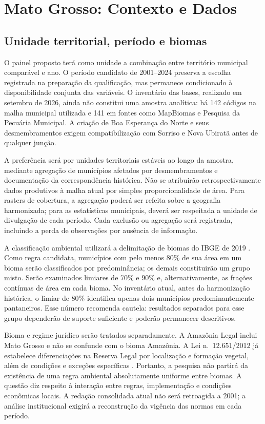 \section{Mato Grosso: Contexto e Dados}
\label{sec:dados}

\subsection{Unidade territorial, período e biomas}

O painel proposto terá como unidade a combinação entre território municipal comparável e ano. O período candidato de 2001--2024 preserva a escolha registrada na preparação da qualificação, mas permanece condicionado à disponibilidade conjunta das variáveis. O inventário das bases, realizado em setembro de 2026, ainda não constitui uma amostra analítica: há 142 códigos na malha municipal utilizada e 141 em fontes como MapBiomas e Pesquisa da Pecuária Municipal. A criação de Boa Esperança do Norte e seus desmembramentos exigem compatibilização com Sorriso e Nova Ubiratã antes de qualquer junção.

A preferência será por unidades territoriais estáveis ao longo da amostra, mediante agregação de municípios afetados por desmembramentos e documentação da correspondência histórica. Não se atribuirão retrospectivamente dados produtivos à malha atual por simples proporcionalidade de área. Para rasters de cobertura, a agregação poderá ser refeita sobre a geografia harmonizada; para as estatísticas municipais, deverá ser respeitada a unidade de divulgação de cada período. Cada exclusão ou agregação será registrada, incluindo a perda de observações por ausência de informação.

A classificação ambiental utilizará a delimitação de biomas do IBGE de 2019 \cite{IBGEBiomas2019}. Como regra candidata, municípios com pelo menos 80\% de sua área em um bioma serão classificados por predominância; os demais constituirão um grupo misto. Serão examinados limiares de 70\% e 90\% e, alternativamente, as frações contínuas de área em cada bioma. No inventário atual, antes da harmonização histórica, o limiar de 80\% identifica apenas dois municípios predominantemente pantaneiros. Esse número recomenda cautela: resultados separados para esse grupo dependerão de suporte suficiente e poderão permanecer descritivos.

Bioma e regime jurídico serão tratados separadamente. A Amazônia Legal inclui Mato Grosso e não se confunde com o bioma Amazônia. A Lei n.\ 12.651/2012 já estabelece diferenciações na Reserva Legal por localização e formação vegetal, além de condições e exceções específicas \cite[arts.~3 e 12]{Brasil2012}. Portanto, a pesquisa não partirá da existência de uma regra ambiental absolutamente uniforme entre biomas. A questão diz respeito à interação entre regras, implementação e condições econômicas locais. A redação consolidada atual não será retroagida a 2001; a análise institucional exigirá a reconstrução da vigência das normas em cada período.

